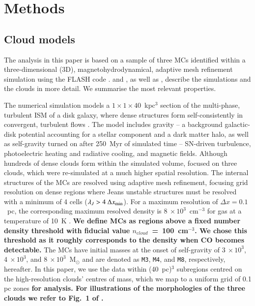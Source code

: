 \section{Methods}\label{methods}


\subsection{Cloud models}\label{methods:clouds}

The analysis in this paper is based on a sample of three MCs identified within a three-dimensional (3D), magnetohydrodynamical, adaptive mesh refinement simulation using the FLASH code \citep{Fryxell2000}.  
 and , as well as \citet[ hereafter]{Chira2018}, describe the simulations and the clouds in more detail. 
We summarise the most relevant properties. 

The numerical simulation models a $1\times1\times40$~kpc$^3$ section of the multi-phase, turbulent ISM of a disk galaxy, where dense structures form self-consistently in convergent, turbulent flows .  
The model includes gravity -- a background galactic-disk potential accounting for a stellar component and a dark matter halo, as well as self-gravity turned on after 250~Myr of simulated time -- SN-driven turbulence, photoelectric heating and radiative cooling, and magnetic fields. 
Although hundreds of dense clouds form within the simulated volume,  focused on three clouds, which were re-simulated at a much higher spatial resolution.
The internal structures of the MCs are resolved using adaptive mesh refinement, focusing grid resolution on dense regions where Jeans unstable structures must be resolved with a minimum of 4 cells ($\lambda_J > 4~\Delta x_{\rm min}$).
For a maximum resolution of $\Delta x = 0.1$~pc, the corresponding maximum resolved density is $8~\times 10^3$~cm$^{-3}$ for gas at a temperature of 10~K . 
\textbf{
We define MCs as regions above a fixed number density threshold with fiducial value $n_{\mathrm cloud}$~=~100~cm$^{-3}$.
We chose this threshold as it roughly corresponds to the density when CO becomes detectable.
}
The MCs have initial masses at the onset of self-gravity of $3~\times 10^3$, $4~\times 10^3$, and $8~\times 10^3$~M$_{\odot}$ and are denoted as \texttt{M3}, \texttt{M4}, and \texttt{M8}, respectively, hereafter. 
In this paper, we use the data within (40~pc)$^{3}$ subregions centred on the high-resolution clouds' centres of mass, which we map to a uniform grid of 0.1 pc zones \textbf{for analysis.
For illustrations of the morphologies of the three clouds we refer to Fig.~1 of .
}

